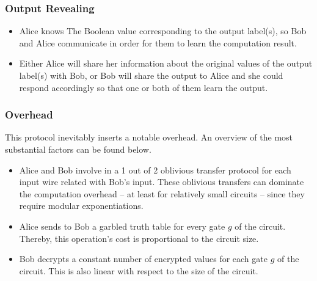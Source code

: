\subsubsection{Output Revealing}
\begin{itemize}
  \item Alice knows The Boolean value corresponding to the output label(s), so Bob and Alice communicate in order for them to learn the computation result.
  \item Either Alice will share her information about the original values of the output label(s) with Bob, or Bob will share the output to Alice and she could respond accordingly so that one or both of them learn the output.
\end{itemize}

\subsubsection{Overhead}
This protocol inevitably inserts a notable overhead. An overview of the most substantial factors can be found below.

\begin{itemize}
  \item Alice and Bob involve in a 1 out of 2 oblivious transfer protocol for each input wire related with Bob's input. These oblivious transfers can dominate the computation overhead -- at least for relatively small circuits -- since they require modular exponentiations.
  \item Alice sends to Bob a garbled truth table for every gate $g$ of the circuit. Thereby, this operation's cost is proportional to the circuit size.
  \item Bob decrypts a constant number of encrypted values for each gate $g$ of the circuit. This is also linear with respect to the size of the circuit.
\end{itemize}






